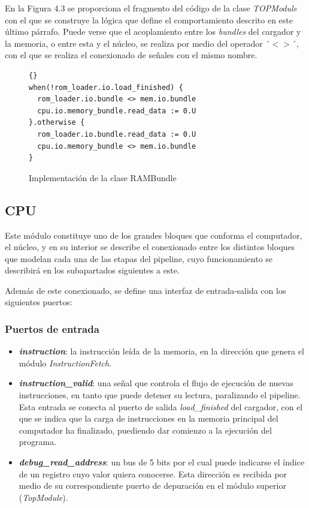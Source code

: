 En la Figura 4.3 se proporciona el fragmento del código de la clase \textit{TOPModule} con el que se construye la lógica que define el comportamiento descrito en este último párrafo. Puede verse que el acoplamiento entre los \textit{bundles} del cargador y la memoria, o entre esta y el núcleo, se realiza por medio del operador ´$<>$´, con el que se realiza el conexionado de señales con el mismo nombre.
\vspace{+0.3cm}
\begin{figure}[h]
\begin{lstlisting}[style=scalaStyle]{}
when(!rom_loader.io.load_finished) {
  rom_loader.io.bundle <> mem.io.bundle
  cpu.io.memory_bundle.read_data := 0.U
}.otherwise {
  rom_loader.io.bundle.read_data := 0.U
  cpu.io.memory_bundle <> mem.io.bundle
}
\end{lstlisting}
\caption{Implementación de la clase RAMBundle}
\end{figure}

\subsection{CPU}

Este módulo constituye uno de los grandes bloques que conforma el computador, el núcleo, y en su interior se describe el conexionado entre los distintos bloques que modelan cada una de las etapas del pipeline, cuyo funcionamiento se describirá en los subapartados siguientes a este.

Además de este conexionado, se define una interfaz de entrada-salida con los siguientes puertos:

\subsubsection{Puertos de entrada}
\begin{itemize}
  \item \textbf{\textit{instruction}}: la instrucción leída de la memoria, en la dirección que genera el módulo \textit{InstructionFetch}.
  \vspace{-0.2cm}
  \item \textbf{\textit{instruction\_valid}}: una señal que controla el flujo de ejecución de nuevas instrucciones, en tanto que puede detener su lectura, paralizando el pipeline. Esta entrada se conecta al puerto de salida \textit{load\_finished} del cargador, con el que se indica que la carga de instrucciones en la memoria principal del computador ha finalizado, puediendo dar comienzo a la ejecución del programa.
  \vspace{-0.2cm}
  \item \textbf{\textit{debug\_read\_address}}: un bus de 5 bits por el cual puede indicarse el índice de un registro cuyo valor quiera conocerse. Esta dirección es recibida por medio de su correspondiente puerto de depuración en el módulo superior (\textit{TopModule}).
\end{itemize}

